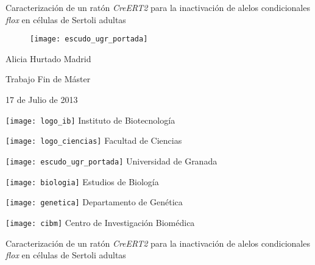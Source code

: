 \documentclass[a4paper,twoside,12pt]{book}
\date{17 Julio de 2013}
\title{\titulo}
\author{Alicia Hurtado Madrid}
\newcommand{\titulo}{Caracterización de un ratón \emph{CreERT2} para la inactivación de alelos condicionales \emph{flox} en células de Sertoli adultas}
\begin{document}


\frontmatter

\renewcommand{\labelitemi}{$\bullet$}
\renewcommand{\labelitemii}{---}
\renewcommand{\labelitemiii}{--}


\pagestyle{empty}
\begin{center}
\LARGE
\titulo
\end{center}
\vspace{20ex}
\begin{figure}[h]
\centering
\texttt{[image: escudo\_ugr\_portada]}
\end{figure}
\vspace{25ex}

\begin{center}
\large
Alicia Hurtado Madrid
\end{center}
\begin{center}
\large
Trabajo Fin de Máster

17 de Julio de 2013
\end{center}
\cleardoublepage
\thispagestyle{empty}
\begin{minipage}[t]{.23\textwidth}
\centering
\texttt{[image: logo\_ib]}
Instituto de Biotecnolog\'ia 
\end{minipage}
\hfill
\begin{minipage}[t]{.23\textwidth}
\centering
\texttt{[image: logo\_ciencias]}
Facultad de Ciencias
\end{minipage}
\hfill
\begin{minipage}[t]{.23\textwidth}
\centering
\texttt{[image: escudo\_ugr\_portada]}
 Universidad de Granada
\end{minipage}


\begin{minipage}[b]{.23\textwidth}
\centering
\texttt{[image: biologia]}
Estudios de Biolog\'ia
\end{minipage}
\hfill
\begin{minipage}[b]{.23\textwidth}
\centering
\texttt{[image: genetica]}
Departamento de Gen\'etica
\end{minipage}
\hfill
\begin{minipage}[b]{.23\textwidth}
\centering
\texttt{[image: cibm]}
Centro de Investigaci\'on Biom\'edica
\end{minipage}
\vfill
\begin{center}
\LARGE
 \titulo
\end{center}
\vfill
\end{document}
